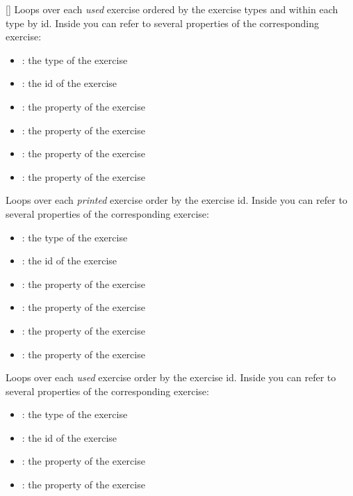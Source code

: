 \documentclass{xsim-manual}
\begin{document}
\begin{commands}
  []
    Loops over each \emph{used} exercise ordered by the exercise types and
    within each type by id.  Inside  you can refer to several
    properties of the corresponding exercise:
    \begin{itemize}
      \item {}: the type of the exercise
      \item {}: the id of the exercise
      \item {}: the  property of the exercise
      \item {}: the  property of the exercise
      \item {}: the  property of the exercise
      \item {}: the  property of the exercise
    \end{itemize}
    Loops over each \emph{printed} exercise order by the exercise id.  Inside
     you can refer to several properties of the corresponding
    exercise:
    \begin{itemize}
      \item {}: the type of the exercise
      \item {}: the id of the exercise
      \item {}: the  property of the exercise
      \item {}: the  property of the exercise
      \item {}: the  property of the exercise
      \item {}: the  property of the exercise
    \end{itemize}
    Loops over each \emph{used} exercise order by the exercise id.  Inside
     you can refer to several properties of the corresponding
    exercise:
    \begin{itemize}
      \item {}: the type of the exercise
      \item {}: the id of the exercise
      \item {}: the  property of the exercise
      \item {}: the  property of the exercise

\end{itemize}
\end{commands}
\end{document}
